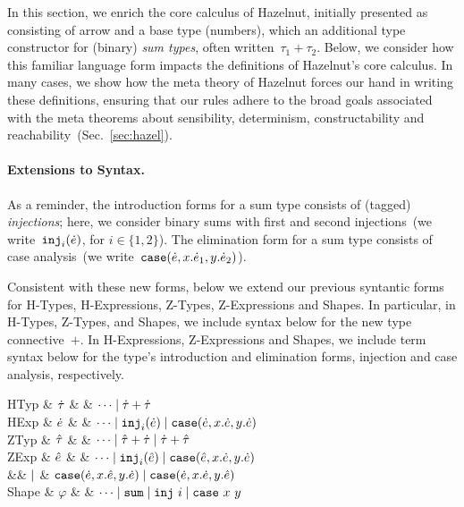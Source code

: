
In this section, we enrich the core calculus of Hazelnut, initially
presented as consisting of arrow and a base type (numbers), which an
additional type constructor for (binary) \emph{sum types}, often
written~$\tau_1 + \tau_2$.
%
Below, we consider how this familiar language form impacts the
definitions of Hazelnut's core calculus.
%
In many cases, we show how the meta theory of Hazelnut forces our hand
in writing these definitions, ensuring that our rules adhere to the
broad goals associated with the meta theorems about sensibility,
determinism, constructability and reachability~(Sec.~\ref{sec:hazel}).

\paragraph{Extensions to Syntax.} 
%
As a reminder, the introduction forms for a sum type consists of
(tagged) \emph{injections}; here, we consider binary sums with first
and second injections~(we write~$\texttt{inj}_{i}({\dot{e}})$, for
$i\in\{1,2\}$). The elimination form for a sum type consists of case
analysis~(we write~$\texttt{case}({\dot{e}},{x}.{\dot{e}_1},{y}.{\dot{e}_2})$).

Consistent with these new forms, below we extend our previous
syntantic forms for H-Types, H-Expressions, Z-Types, Z-Expressions and
Shapes.
%
In particular, in H-Types, Z-Types, and Shapes, we include syntax
below for the new type connective~$+$.
%
In H-Expressions, Z-Expressions and Shapes, we include term syntax
below for the type's introduction and elimination forms, injection and
case analysis, respectively.

\begin{grammar}
\textsf{HTyp} & $\dot{\tau}$ & \bnfas & $\cdots \mathrel{\mid} {\dot{\tau}} + {\dot{\tau}}$
\\
\textsf{HExp} & $\dot{e}$ & \bnfas & $\cdots 
\mathrel{\mid} \texttt{inj}_{i}({\dot{e}})
\mathrel{\mid} \texttt{case}({\dot{e}},{x}.{\dot{e}},{y}.{\dot{e}})$
\\[2mm]
\textsf{ZTyp} & $\hat{\tau}$ & \bnfas & $\cdots \mathrel{\mid} {\hat{\tau}} + {\dot{\tau}} \mathrel{\mid} {\dot{\tau}} + {\hat{\tau}}$
\\
\textsf{ZExp} & $\hat{e}$ & \bnfas & $\cdots
\mathrel{\mid} \texttt{inj}_{i}({\hat{e}})
\mathrel{\mid} \texttt{case}({\hat{e}},{x}.{\dot{e}},{y}.{\dot{e}})$
\\
&& $\mathrel{\mid}$ & $\texttt{case}({\dot{e}},{x}.{\hat{e}},{y}.{\dot{e}})
\mathrel{\mid}\texttt{case}({\dot{e}},{x}.{\dot{e}},{y}.{\hat{e}})$
\\[2mm]
\textsf{Shape} & $\varphi$ & \bnfas & $\cdots \mathrel{\mid} \mathtt{sum} \mathrel{\mid} \mathtt{inj}~i \mathrel{\mid} \mathtt{case}~x~y$
\end{grammar}

